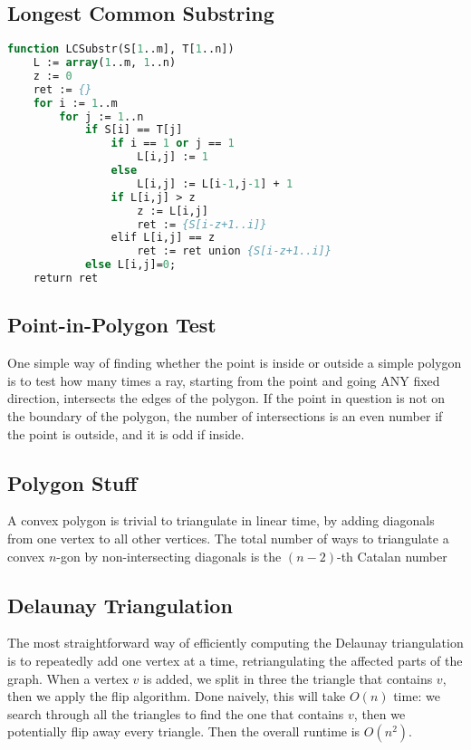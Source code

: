\documentclass[10pt,a4paper]{article}
\begin{document}
\subsection*{Longest Common Substring}
\begin{lstlisting}[language=Pascal]
function LCSubstr(S[1..m], T[1..n])
    L := array(1..m, 1..n)
    z := 0
    ret := {}
    for i := 1..m
        for j := 1..n
            if S[i] == T[j]
                if i == 1 or j == 1
                    L[i,j] := 1
                else
                    L[i,j] := L[i-1,j-1] + 1
                if L[i,j] > z
                    z := L[i,j]
                    ret := {S[i-z+1..i]}
                elif L[i,j] == z
                    ret := ret union {S[i-z+1..i]}
            else L[i,j]=0;
    return ret
\end{lstlisting}


\subsection*{Point-in-Polygon Test}
One simple way of finding whether the point is inside or outside a simple polygon is to test how many times a ray, starting from the point and going ANY fixed direction, intersects the edges of the polygon. If the point in question is not on the boundary of the polygon, the number of intersections is an even number if the point is outside, and it is odd if inside. 


\subsection*{Polygon Stuff}
A convex polygon is trivial to triangulate in linear time, by adding diagonals from one vertex to all other vertices.
The total number of ways to triangulate a convex $n$-gon by non-intersecting diagonals is the $(n - 2)$-th Catalan number

\subsection*{Delaunay Triangulation}
The most straightforward way of efficiently computing the Delaunay triangulation is to repeatedly add one vertex at a time, retriangulating the affected parts of the graph. When a vertex $v$ is added, we split in three the triangle that contains $v$, then we apply the flip algorithm. Done naively, this will take $O(n)$ time: we search through all the triangles to find the one that contains $v$, then we potentially flip away every triangle. Then the overall runtime is $O(n^2)$.
\end{document}
